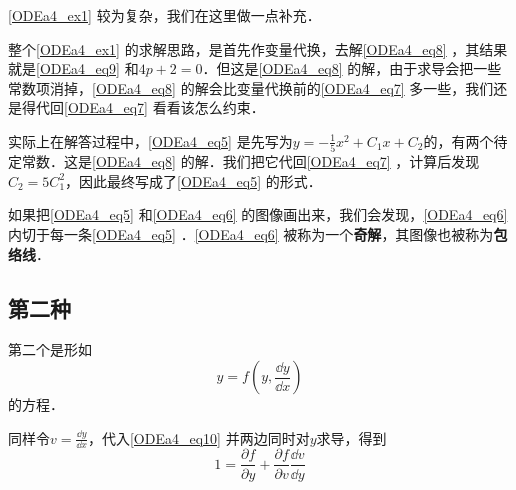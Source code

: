 \autoref{ODEa4_ex1} 较为复杂，我们在这里做一点补充．

整个\autoref{ODEa4_ex1} 的求解思路，是首先作变量代换，去解\autoref{ODEa4_eq8} ，其结果就是\autoref{ODEa4_eq9} 和$4p+2=0$．但这是\autoref{ODEa4_eq8} 的解，由于求导会把一些常数项消掉，\autoref{ODEa4_eq8} 的解会比变量代换前的\autoref{ODEa4_eq7} 多一些，我们还是得代回\autoref{ODEa4_eq7} 看看该怎么约束．

实际上在解答过程中，\autoref{ODEa4_eq5} 是先写为$y=-\frac{1}{5}x^2+C_1x+C_2$的，有两个待定常数．这是\autoref{ODEa4_eq8} 的解．我们把它代回\autoref{ODEa4_eq7} ，计算后发现$C_2=5C_1^2$，因此最终写成了\autoref{ODEa4_eq5} 的形式．

如果把\autoref{ODEa4_eq5} 和\autoref{ODEa4_eq6} 的图像画出来，我们会发现，\autoref{ODEa4_eq6} 内切于每一条\autoref{ODEa4_eq5} 
．\autoref{ODEa4_eq6} 被称为一个\textbf{奇解}，其图像也被称为\textbf{包络线}．

\subsection{第二种}

第二个是形如
\begin{equation}\label{ODEa4_eq10}
y=f(y, \frac{\dd y}{\dd x})
\end{equation}
的方程．

同样令$v=\frac{\dd y}{\dd x}$，代入\autoref{ODEa4_eq10} 并两边同时对$y$求导，得到
\begin{equation}
1=\frac{\partial f}{\partial y}+\frac{\partial f}{\partial v}\frac{\dd v}{\dd y}
\end{equation}






















